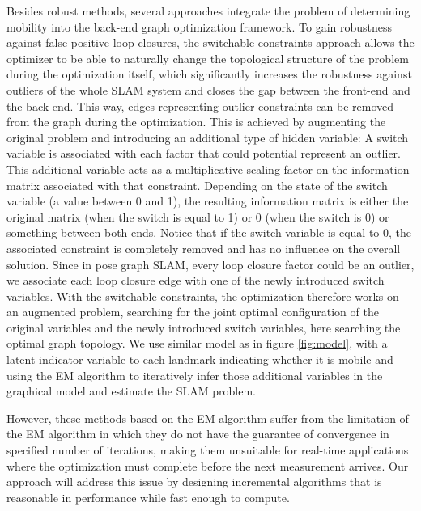 Besides robust methods, several approaches integrate the problem of
determining mobility into the back-end graph optimization framework.  To gain
robustness against false positive loop closures, the switchable
constraints\cite{Switchable12} approach allows the optimizer to be able to
naturally change the topological structure of the problem during the
optimization itself, which significantly increases the robustness against
outliers of the whole SLAM system and closes the gap between the front-end and
the back-end.  This way, edges representing outlier constraints can be removed
from the graph during the optimization.  This is achieved by augmenting the
original problem and introducing an additional type of hidden variable: A
switch variable is associated with each factor that could potential represent
an outlier. This additional variable acts as a multiplicative scaling factor
on the information matrix associated with that constraint. Depending on the
state of the switch variable (a value between 0 and 1), the resulting
information matrix is either the original matrix (when the switch is equal to
1) or 0 (when the switch is 0) or something between both ends. Notice that if
the switch variable is equal to 0, the associated constraint is completely
removed and has no influence on the overall solution. Since in pose graph
SLAM, every loop closure factor could be an outlier, we associate each loop
closure edge with one of the newly introduced switch variables. With the
switchable constraints, the optimization therefore works on an augmented
problem, searching for the joint optimal configuration of the original
variables and the newly introduced switch variables, here searching the
optimal graph topology. We use similar model as \cite{Haehnel03}
\cite{rogers2010slam} in figure \ref{fig:model}, with a latent indicator
variable to each landmark indicating whether it is mobile and using the EM
algorithm to iteratively infer those additional variables in the graphical
model and estimate the SLAM problem.

However, these methods based on the EM algorithm suffer from the limitation of
the EM algorithm in which they do not have the guarantee of convergence in
specified number of iterations, making them unsuitable for real-time
applications where the optimization must complete before the next measurement
arrives. Our approach will address this issue by designing incremental
algorithms that is reasonable in performance while fast enough to compute.


